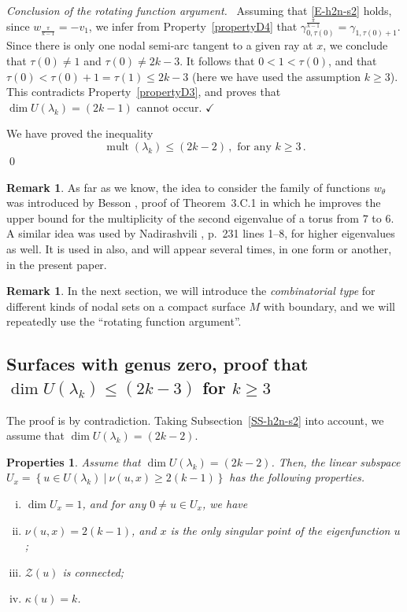 \documentclass[12pt,a4paper]{amsart}
\theoremstyle{plain} %
\newtheorem{properties}[theorem]{Properties}
\theoremstyle{definition}
\newtheorem{remark}[theorem]{Remark}
\numberwithin{equation}{section}
\numberwithin{figure}{section}
\numberwithin{table}{section}
\newcommand{\cZ}{\mathcal{Z}}
\DeclareMathOperator{\mult}{mult}
\newcommand{\qedc}{$\checkmark$}
\newcommand{\set}[1]{\left\lbrace #1 \right\rbrace}
\begin{document}
\emph{Conclusion of the rotating function argument.}~  Assuming that \eqref{E-h2n-s2} holds, since $w_{\frac{\pi}{k-1}} = - v_1$, we infer from Property~\ref{propertyD4} that $\gamma^{\frac{\pi}{k-1}}_{0,\tau(0)}= \gamma_{1,\tau(0)+1}$. Since there is only one nodal semi-arc tangent to a given ray at $x$, we conclude that $\tau(0) \not = 1$ and $\tau(0) \not = 2k-3$. It follows that $0 < 1 < \tau(0)$, and that $\tau(0) < \tau(0)+1 = \tau(1) \le 2k-3$  (here we have used the assumption $k\ge 3$). This contradicts Property~\ref{propertyD3}, and proves that $\dim U(\lambda_k) = (2k-1)$ cannot occur. \hfill \qedc \medskip

We have proved the inequality
%
\begin{equation}\label{E-h2n-b2}
\mult(\lambda_k) \le (2k-2)\,, \text{~for any~} k\ge 3\,.
\end{equation}
\hfill \qed

\begin{remark}\label{R-h2n-bess}
As far as we know, the idea to consider the family of functions $w_{\theta}$ was introduced by Besson \cite{Bess1980}, proof of Theorem~3.C.1 in which he improves the upper bound for the multiplicity of the second eigenvalue of a torus from $7$ to $6$. A similar idea was used by Nadirashvili  \cite{Nadi1987}, p.~231 lines 1--8, for higher eigenvalues as well. It is used in \cite{HoHN1999, HoMN1999} also, and will appear several times, in one form or another, in the present paper.
\end{remark}%

\begin{remark}\label{R-h2n-f}
In the next section, we will introduce the \emph{combinatorial type} for different kinds of nodal sets on a compact surface $M$ with boundary, and we will repeatedly use the ``rotating function argument''.
\end{remark}%




\subsection{Surfaces with genus zero, proof that $\dim U(\lambda_k) \le (2k-3)$ for $k\ge 3$}\label{SS-h2n-s3}\phantom{}

 The proof is by contradiction. Taking Subsection~\ref{SS-h2n-s2} into account, we assume that $\dim U(\lambda_k) = (2k-2)$.

\begin{properties} \label{propertyD6} Assume that $\dim U(\lambda_k) = (2k-2)$.  Then, the linear subspace $U_x = \set{u \in U(\lambda_k) ~|~ \nu(u,x) \ge 2(k-1)}$ has the following properties.
\begin{enumerate}[(i)]
 \item $\dim U_x = 1$, and for any $0\not = u \in U_x$, we have
 \item $\nu(u,x) = 2(k-1)$, and $x$ is the only singular point of the eigenfunction $u$;
 \item $\cZ(u)$ is connected;
 \item $\kappa(u) = k$.
 \end{enumerate}
\end{properties}
\end{document}
